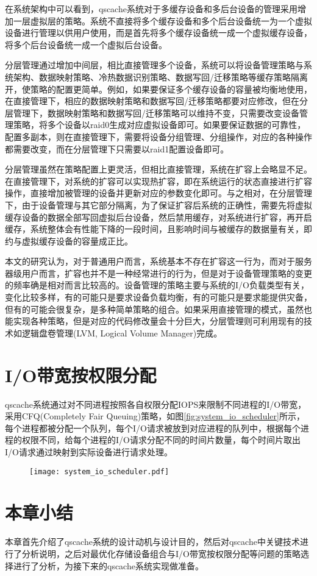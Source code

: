 \label{sec:multi-cache_to_multi-backend}

在系统架构中可以看到，qscache系统对于多缓存设备和多后台设备的管理采用增加一层虚拟层的策略。系统不直接将多个缓存设备和多个后台设备统一为一个虚拟设备进行管理以供用户使用，而是首先将多个缓存设备统一成一个虚拟缓存设备，将多个后台设备统一成一个虚拟后台设备。

分层管理通过增加中间层，相比直接管理多个设备，系统可以将设备管理策略与系统架构、数据映射策略、冷热数据识别策略、数据写回/迁移策略等缓存策略隔离开，使策略的配置更简单。例如，如果要保证多个缓存设备的容量被均衡地使用，在直接管理下，相应的数据映射策略和数据写回/迁移策略都要对应修改，但在分层管理下，数据映射策略和数据写回/迁移策略可以维持不变，只需要改变设备管理策略，将多个设备以raid0生成对应虚拟设备即可。如果要保证数据的可靠性，配置多副本，则在直接管理下，需要将设备分组管理、分组操作，对应的各种操作都需要改变，而在分层管理下只需要以raid1配置设备即可。

分层管理虽然在策略配置上更灵活，但相比直接管理，系统在扩容上会略显不足。在直接管理下，对系统的扩容可以实现热扩容，即在系统运行的状态直接进行扩容操作，直接增加被管理的设备并更新对应的参数变化即可。与之相对，在分层管理下，由于设备管理与其它部分隔离，为了保证扩容后系统的正确性，需要先将虚拟缓存设备的数据全部写回虚拟后台设备，然后禁用缓存，对系统进行扩容，再开启缓存，系统整体会有性能下降的一段时间，且影响时间与被缓存的数据量有关，即约与虚拟缓存设备的容量成正比。

本文的研究认为，对于普通用户而言，系统基本不存在扩容这一行为，而对于服务器级用户而言，扩容也并不是一种经常进行的行为，但是对于设备管理策略的变更的频率确是相对而言比较高的。设备管理的策略主要与系统的I/O负载类型有关，变化比较多样，有的可能只是要求设备负载均衡，有的可能只是要求能提供灾备，但有的可能会很复杂，是多种简单策略的组合。如果采用直接管理的模式，虽然也能实现各种策略，但是对应的代码修改量会十分巨大，分层管理则可利用现有的技术如逻辑盘卷管理(LVM, Logical Volume Manager)\cite{wada2009logical}完成。

\section{I/O带宽按权限分配}

qscache系统通过对不同进程按照各自权限分配IOPS来限制不同进程的I/O带宽，采用CFQ(Completely Fair Queuing)策略，如图\ref{fig:system_io_scheduler}所示，每个进程都被分配一个队列，每个I/O请求被放到对应进程的队列中，根据每个进程的权限不同，给每个进程的I/O请求分配不同的时间片数量，每个时间片取出I/O请求通过映射到实际设备进行请求处理。

\begin{figure}[!htbp]
    \centering
    \texttt{[image: system\_io\_scheduler.pdf]}
\end{figure}

\section{本章小结}

本章首先介绍了qscache系统的设计动机与设计目的，然后对qscache中关键技术进行了分析说明，之后对最优化存储设备组合与I/O带宽按权限分配等问题的策略选择进行了分析，为接下来的qscache系统实现做准备。